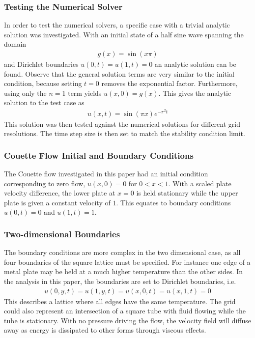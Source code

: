 \documentclass[aps,reprint]{revtex4-1}
\begin{document}
\subsubsection{Testing the Numerical Solver}
In order to test the numerical solvers, a specific case with a trivial analytic solution
was investigated. With an initial state of a half sine wave spanning the domain
\begin{align*}
  g(x) = \sin{(x \pi)}
\end{align*}
and Dirichlet boundaries $u(0,t) = u(1,t) = 0$ an analytic solution can be found.
Observe that the general solution terms are very similar to the initial condition,
because setting $t = 0$ removes the exponential factor. Furthermore, using only
the $n = 1$ term yields $u(x,0) = g(x)$. This gives the analytic solution to the test case as
\begin{align*}
  u(x,t) = \sin{(\pi x)} e^{- \pi^2 t}
\end{align*}
This solution was then tested against the numerical solutions for different grid
resolutions. The time step size is then set to match the stability condition limit.
\subsubsection{Couette Flow Initial and Boundary Conditions}
The Couette flow investigated in this paper had an initial condition
corresponding to zero flow, $u(x,0) = 0$ for $0 < x < 1$. With a scaled plate velocity difference, the
lower plate at $x = 0$ is held stationary while the upper plate is given a constant
velocity of $1$. This equates to boundary conditions $u(0,t) = 0$ and $u(1,t) = 1$.
\subsubsection{Two-dimensional Boundaries}
The boundary conditions are more complex in the two dimensional case, as all
four boundaries of the square lattice must be specified.
For instance one edge of a metal plate may be held at a much
higher temperature than the other sides. In the analysis in this paper, the boundaries
are set to Dirichlet boundaries, i.e.
\begin{align*}
  u(0,y,t) = u(1,y,t) = u(x,0,t) = u(x,1,t) = 0
\end{align*}
This describes a lattice where all edges have the same temperature. The grid could also represent an
intersection of a square tube with fluid flowing while the tube is stationary. With no
pressure driving the flow, the velocity field will diffuse away as energy is dissipated
to other forms through viscous effects.
\end{document}
